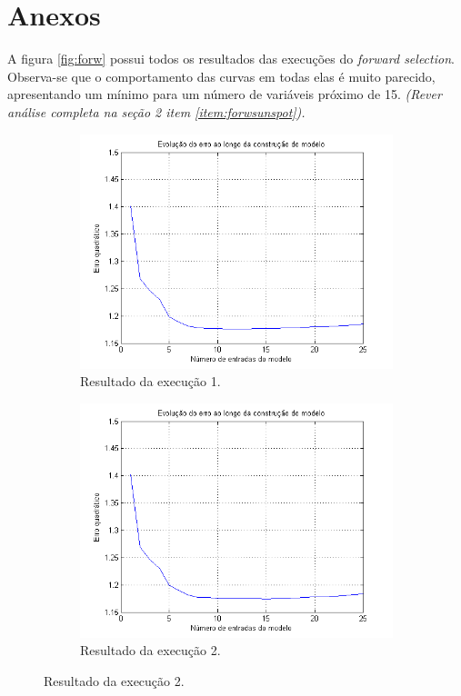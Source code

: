 \newpage

\section{Anexos}

A figura \ref{fig:forw} possui todos os resultados das execuções do
\textit{forward selection}. Observa-se que o comportamento das curvas em todas
elas é muito parecido, apresentando um mínimo para um número de variáveis
próximo de 15. \textit{(Rever análise completa na seção 2 item
\ref{item:forwsunspot}).}

\FloatBarrier
\begin{figure}[H] 
				
			\centering
			
				\begin{subfigure}{.5\textwidth}
				  \centering
				  \includegraphics[width=1\linewidth]{image/forward1}
				  \caption{Resultado da execução 1.}
				  \label{forward1}
				\end{subfigure}%
				\begin{subfigure}{.5\textwidth}
				  \centering
				  \includegraphics[width=1\linewidth]{image/forward2}
				  \caption{Resultado da execução 2.}
				  \label{forward2}
			\end{subfigure}
			

\end{figure}
